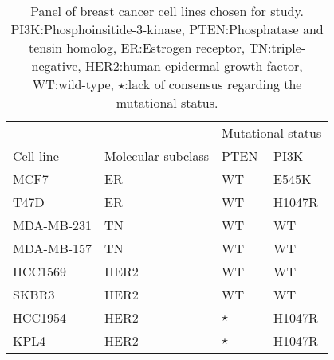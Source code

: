 \documentclass[a4paper,11pt,twoside,openright]{scrbook}
\begin{document}


\begin{table}[]
    \begin{footnotesize}
    \captionsetup{width=0.60\textwidth}
    \centering
    \caption[Panel of breast cancer cell lines chosen for study]{Panel of breast cancer cell lines chosen for study. PI3K:Phosphoinsitide-3-kinase, PTEN:Phosphatase and tensin homolog, ER:Estrogen receptor, TN:triple-negative, HER2:human epidermal growth factor, WT:wild-type, $\star$:lack of consensus regarding the mutational status.}
    \label{table:cell-lines}
    \begin{tabular}{@{}llll@{}}
    \toprule
               &                    & \multicolumn{2}{l}{Mutational status} \\
    Cell line  & Molecular subclass & PTEN             & PI3K               \\ \midrule
    MCF7       & ER                 & WT               & E545K              \\
    T47D       & ER                 & WT               & H1047R             \\
    MDA-MB-231 & TN                 & WT               & WT                 \\
    MDA-MB-157 & TN                 & WT               & WT                 \\
    HCC1569    & HER2               & WT               & WT                 \\
    SKBR3      & HER2               & WT               & WT                 \\
    HCC1954    & HER2               & $\star$          & H1047R             \\
    KPL4       & HER2               & $\star$          & H1047R             \\ \bottomrule
    \end{tabular}
    \end{footnotesize}
\end{table}


\end{document}
